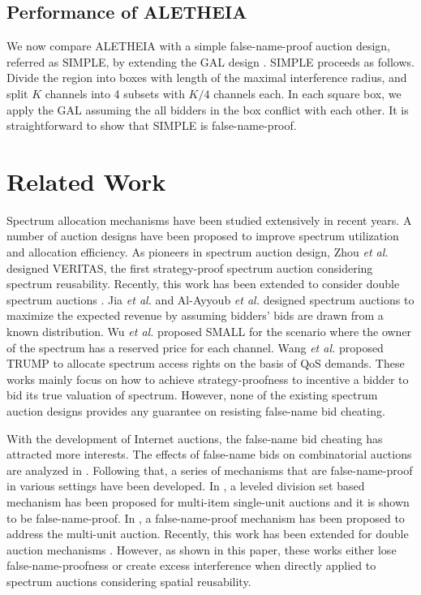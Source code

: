 \documentclass{sig-alternate}
\begin{document}
\subsection{Performance of ALETHEIA}
We now compare ALETHEIA with a simple false-name-proof auction design, referred as SIMPLE, by extending the GAL design \cite{Terada:03:AAMAS}. SIMPLE proceeds as follows. Divide the region into boxes with length of the maximal interference radius, and split $K$ channels into 4 subsets with $K/4$ channels each. In each square box, we apply the GAL assuming the all bidders in the box conflict with each other. It is straightforward to show that SIMPLE is false-name-proof.

\section{Related Work}
Spectrum allocation mechanisms have been studied extensively in recent years. A number of auction designs have been proposed to improve spectrum utilization and allocation efficiency. As pioneers in spectrum auction design, Zhou \emph{et al.} \cite{Mobicom08:Zhou} designed VERITAS, the first strategy-proof spectrum auction considering spectrum reusability. Recently, this work has been extended to consider double spectrum auctions \cite{Zhou:09:info}. Jia \emph{et al.} \cite{Jia:09:Mobihoc} and Al-Ayyoub \emph{et al.} \cite{Al:11:INFOCOM} designed spectrum auctions to maximize the expected revenue by assuming bidders' bids are drawn from a known distribution. Wu \emph{et al.} \cite{Wu:11:INFOCOM} proposed SMALL for the scenario where the owner of the spectrum has a reserved price for each channel. Wang \emph{et al.} \cite{Wang:TPDS:13} proposed TRUMP to allocate spectrum access rights on the basis of QoS demands. These works mainly focus on how to achieve strategy-proofness to incentive a bidder to bid its true valuation of spectrum. However,  none of the existing spectrum auction designs provides any guarantee on resisting false-name bid cheating.

With the development of Internet auctions, the false-name bid cheating has attracted more interests. The effects of false-name bids on combinatorial auctions are analyzed in \cite{Yokoo:GEB:04}. Following that, a series of mechanisms that are false-name-proof in various settings have been developed. In \cite{Yokoo:AI:02}, a leveled division set based mechanism has been proposed for multi-item single-unit auctions and it is shown to be false-name-proof. In \cite{Yokoo:ijcai:01}, a false-name-proof mechanism has been proposed to address the multi-unit auction. Recently, this work has been extended for double auction mechanisms \cite{Yokoo:dcs:05}. However, as shown in this paper, these works either lose false-name-proofness or create excess interference when directly applied to spectrum auctions considering spatial reusability.
\end{document}
